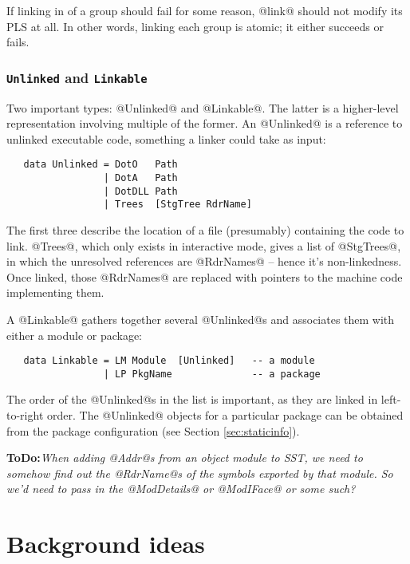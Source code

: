\documentclass[11pt]{article}
\newcommand{\ToDo}[1]{{{\bf ToDo:}\sl #1}}
\begin{document}
If linking in of a group should fail for some reason, @link@ should
not modify its PLS at all.  In other words, linking each group
is atomic; it either succeeds or fails.

\subsubsection*{\mbox{\tt Unlinked} and \mbox{\tt Linkable}}

Two important types: @Unlinked@ and @Linkable@.  The latter is a 
higher-level representation involving multiple of the former.
An @Unlinked@ is a reference to unlinked executable code, something
a linker could take as input:

\begin{verbatim}
   data Unlinked = DotO   Path
                 | DotA   Path            
                 | DotDLL Path
                 | Trees  [StgTree RdrName]
\end{verbatim}

The first three describe the location of a file (presumably)
containing the code to link.  @Trees@, which only exists in
interactive mode, gives a list of @StgTrees@, in which the unresolved
references are @RdrNames@ -- hence it's non-linkedness.  Once linked,
those @RdrNames@ are replaced with pointers to the machine code
implementing them.

A @Linkable@ gathers together several @Unlinked@s and associates them
with either a module or package:

\begin{verbatim}
   data Linkable = LM Module  [Unlinked]   -- a module
                 | LP PkgName              -- a package
\end{verbatim}

The order of the @Unlinked@s in the list is important, as
they are linked in left-to-right order.  The @Unlinked@ objects for a
particular package can be obtained from the package configuration (see
Section \ref{sec:staticinfo}).

\ToDo{When adding @Addr@s from an object module to SST, we need to
      somehow find out the @RdrName@s of the symbols exported by that
      module. 
      So we'd need to pass in the @ModDetails@ or @ModIFace@ or some such?}



\section{Background ideas}
\end{document}
